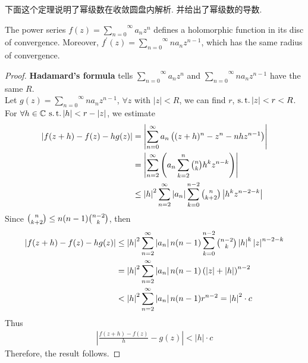 \vspace{2em}
下面这个定理说明了幂级数在收敛圆盘内解析. 并给出了幂级数的导数.
\begin{thm}\label{thm 3.1.2}
	The power series $f(z) = \overset{\infty}{\underset{n = 0}{\sum}}{a_n z^n}$ defines a holomorphic function in its disc of convergence. Moreover, $f^{'}(z) = \overset{\infty}{\underset{n = 0}{\sum}}{n a_n z^{n - 1}}$, which has the same radius of convergence.
	
	\vspace{2em}
	\begin{proof}
		\textbf{Hadamard's formula} tells $\overset{\infty}{\underset{n = 0}{\sum}}{a_n z^n}$ and $\overset{\infty}{\underset{n = 0}{\sum}}{n a_n z^{n - 1}}$ have the same $R$.\\
		Let $g(z) = \overset{\infty}{\underset{n = 0}{\sum}}{n a_n z^{n - 1}}$, $\forall z$ with $\left| z \right| < R$, we can find $r$, $\operatorname{s.t.} \left| z \right| < r < R$.\\
		For $\forall h \in \mathbb{C}$ $\operatorname{s.t.} \left| h \right| < r - \left| z \right|$, we estimate
		\begin{align}
			\left| f(z + h) - f(z) - hg(z) \right| 
			&= \left| \sum_{n = 0}^{\infty}{a_n \left( (z + h)^n - z^n - nhz^{n - 1} \right)} \right| \\
			&= \left| \sum_{n = 2}^{\infty}{\left( a_n \sum_{k = 2}^{n}{\tbinom{n}{k} h^k z^{n - k}} \right)} \right| \\
			&\leq \left| h \right|^2 \sum_{n = 2}^{\infty}{\left| a_n \right|} \sum_{k = 0}^{n - 2}{\tbinom{n}{k + 2} \left| h^k z^{n - 2 - k} \right|}
		\end{align}
		\newpage
		Since $\tbinom{n}{k + 2} \leq n(n - 1)\tbinom{n - 2}{k}$, then
		\begin{align}
			\left| f(z + h) - f(z) - hg(z) \right| 
			&\leq \left| h \right|^2 \sum_{n = 2}^{\infty}{\left| a_n \right| n(n - 1)} \sum_{k = 0}^{n - 2}{\tbinom{n - 2}{k} \left| h \right|^k \left| z \right|^{n - 2 - k}} \\
			&= \left| h \right|^2 \sum_{n = 2}^{\infty}{\left| a_n \right| n(n - 1) \left( \left| z \right| + \left| h \right| \right)^{n - 2}} \\
			&< \left| h \right|^2 \sum_{n = 2}^{\infty}{\left| a_n \right| n(n - 1) r^{n - 2}} = \left| h \right|^2 \cdot c 
		\end{align}
		Thus
		\begin{align}
			\left| \frac{f(z + h) - f(z)}{h} - g(z) \right| < \left| h \right| \cdot c
		\end{align}
		Therefore, the result follows.
	\end{proof}
\end{thm}

